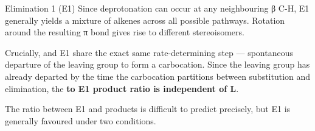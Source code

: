 \documentclass[10pt]{article}
\begin{document}
\begin{core}{Elimination 1 (E1)}
    Since deprotonation can occur at any neighbouring β C-H, E1 generally yields a mixture of alkenes across all possible pathways. Rotation around the resulting π bond gives rise to different stereoisomers.


    Crucially, \sno and E1 share the exact same rate-determining step --- spontaneous departure of the leaving group to form a carbocation. Since the leaving group has already departed by the time the carbocation partitions between substitution and elimination, the \textbf{\sno to E1 product ratio is independent of L}.

    The ratio between E1 and \sno products is difficult to predict precisely, but E1 is generally favoured under two conditions.

    \begin{enumerate}


\end{enumerate}
\end{core}
\end{document}
